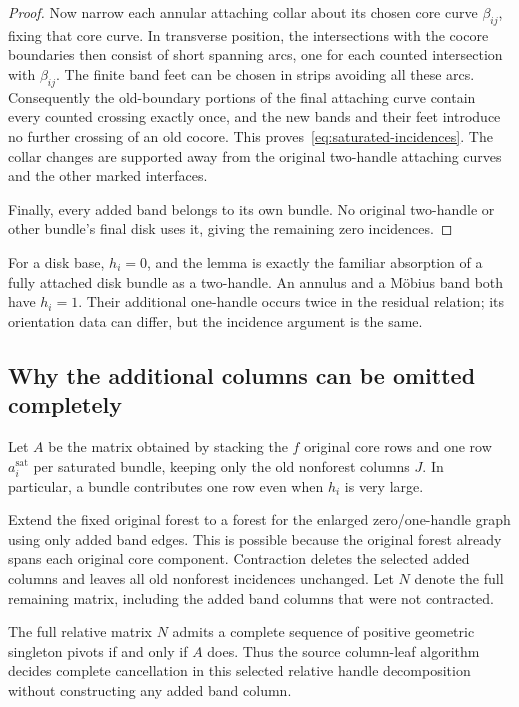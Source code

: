 \begin{proof}
Now narrow each annular attaching collar
about its chosen core curve $\beta_{ij}$, fixing that core curve.  In
transverse position, the intersections with the cocore boundaries then
consist of short spanning arcs, one for each counted intersection with
$\beta_{ij}$.  The finite band feet can be chosen in strips avoiding
all these arcs.  Consequently the old-boundary portions of the final
attaching curve contain every counted crossing exactly once, and the
new bands and their feet introduce no further crossing of an old
cocore.  This proves~\eqref{eq:saturated-incidences}.  The collar
changes are supported away from the original two-handle attaching
curves and the other marked interfaces.

Finally, every added band belongs to its own bundle.  No original
two-handle or other bundle's final disk uses it, giving the remaining
zero incidences.
\end{proof}

For a disk base, $h_i=0$, and the lemma is exactly the familiar absorption
of a fully attached disk bundle as a two-handle.  An annulus and a
M\"obius band both have $h_i=1$.  Their additional one-handle occurs twice
in the residual relation; its orientation data can differ, but the
incidence argument is the same.

\subsection{Why the additional columns can be omitted completely}

Let $A$ be the matrix obtained by stacking the $f$ original core rows and
one row $a_i^{\mathrm{sat}}$ per saturated bundle, keeping only the old
nonforest columns $J$.  In particular, a bundle contributes one row even
when $h_i$ is very large.

Extend the fixed original forest to a forest for the enlarged
zero/one-handle graph using only added band edges.  This is possible
because the original forest already spans each original core component.
Contraction deletes the selected added columns and leaves all old
nonforest incidences unchanged.  Let $N$ denote the full remaining
matrix, including the added band columns that were not contracted.

\begin{theorem}
\label{thm:saturated-even-columns}
The full relative matrix $N$ admits a complete sequence of positive
geometric singleton pivots if and only if $A$ does.  Thus the source
column-leaf algorithm decides complete cancellation in this selected
relative handle decomposition without constructing any added band
column.
\end{theorem}

